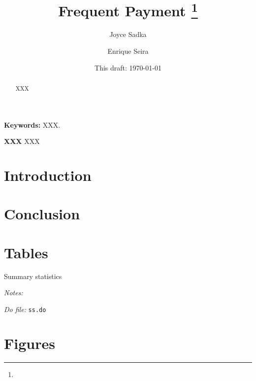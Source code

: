 \documentclass[11pt]{article}
\begin{document}
\title{Frequent Payment \thanks{}}
\author{Joyce Sadka \and Enrique Seira  }
\date{This draft:  \today \\[2 cm]}



\maketitle
\begin{abstract}
XXX 
\end{abstract}

\textbf{Keywords: } XXX.

\textbf{XXX} XXX

\newpage



\section{Introduction}


\section{Conclusion}








\pagebreak




\section{Tables}


\begin{table}[H]
\caption{Summary statistics}
\label{SS}
\begin{center}
\scriptsize{}
\end{center}
 \footnotesize
\textit{Notes:} 

\textit{Do file: } \texttt{ss.do}
\end{table}




\pagebreak





\section{Figures}
\end{document}
